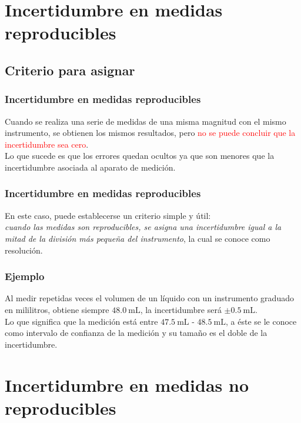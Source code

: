 \section{Incertidumbre en medidas reproducibles}
\subsection{Criterio para asignar}
\begin{frame}
\frametitle{Incertidumbre en medidas reproducibles}
Cuando se realiza una serie de medidas de una misma magnitud con el mismo instrumento, se obtienen los mismos resultados, pero \textcolor{red}{no se puede concluir que la incertidumbre sea cero}.
\\
\bigskip
\pause
Lo que sucede es que los errores quedan ocultos ya que son menores que la incertidumbre asociada al aparato de medición.
\end{frame}
\begin{frame}
\frametitle{Incertidumbre en medidas reproducibles}
En este caso, puede establecerse un criterio simple y útil:
\\
\bigskip
\pause
\textit{cuando las medidas son reproducibles, se asigna una incertidumbre igual a la mitad de la división más pequeña del instrumento}, la cual se conoce como resolución.
\end{frame}
\begin{frame}
\frametitle{Ejemplo}
Al medir repetidas veces el volumen de un líquido con un instrumento graduado en mililitros, obtiene siempre $\SI{48.0}{\milli\liter}$, la incertidumbre será $\pm \SI{0.5}{\milli\liter}$.
\\
\bigskip
\pause
Lo que significa que la medición está entre $\SI{47.5}{\milli\liter}$ - $\SI{48.5}{\milli\liter}$, a éste se le conoce como intervalo de confianza de la medición y su tamaño es el doble de la incertidumbre.
\end{frame}
\section{Incertidumbre en medidas no reproducibles}
